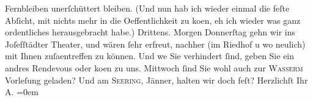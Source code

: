 \begin{ledgroupsized}[t]{13cm}
               Fernbleiben unerſchüttert bleiben. (Und nun hab ich wieder einmal die feſte Abſicht,
               mit nichts mehr in die Oeffentlichkeit zu ko{\geminationm}en, eh ich
               wieder was ganz ordentliches herausgebracht habe.) \pend
           \pstart
           Drittens. Morgen Donnerſtag gehn {\pb}wir ins Joſefſtädter Theater, und wären ſehr
               erfreut, nachher (im Riedhof u wo neulich) mit
               Ihnen zuſa{\geminationm}entreffen zu können. Und we{\geminationn} Sie verhindert ſind, geben Sie ein andres Rendevous
               oder ko{\geminationm}en zu uns. Mittwoch ſind Sie wohl auch zur \textsc{Wasserm} Vorleſung geladen? Und am \textsc{Se{\geminationm}ering}, Jänner, halten wir doch feſt? \pend
           \pstart
           Herzlichſt Ihr {\\[\baselineskip]}\spacefill\mbox{A.}\pend
           \leftskip=0em{}
         
         \endnumbering{}\end{ledgroupsized}\begin{anhang}\end{anhang}\newcommand{\dateiname}{L03001}\newcommand{\titel}{Arthur Schnitzler an Felix Salten, 20. 12. 1905}\newcommand{\editorInnen}{Martin Anton Müller und Laura Untner}
      